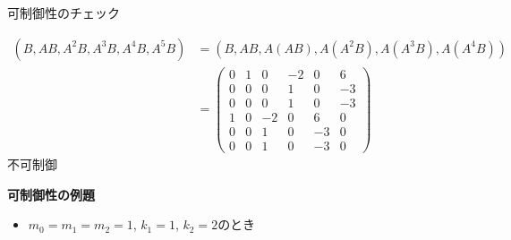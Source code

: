\documentclass[a4paper,11pt]{jreport}
\begin{document}
可制御性のチェック

\begin{align}
 (B,AB, A^2B, A^3B, A^4B, A^5B)
 &=
 (B,AB, A(AB), A(A^2B), A(A^3B), A(A^4B))
\nonumber \\
 &=
 \left(\begin{array}{rrrrrr}
        0 & 1 & 0 & -2& 0 & 6      \\
        0 & 0 & 0 & 1 & 0 & -3      \\
        0 & 0 & 0 & 1 & 0 & -3      \\
	1 & 0 & -2& 0 & 6 & 0 \\
	0 & 0 & 1 & 0 & -3& 0 \\
	0 & 0 & 1 & 0 & -3& 0 
       \end{array}\right)
\nonumber
\end{align}
不可制御

\newpage

\noindent
{\bf 可制御性の例題}

\begin{itemize}
\item $m_0=m_1=m_2=1$, $k_1=1$, $k_2=2$のとき
\end{itemize}
\end{document}

